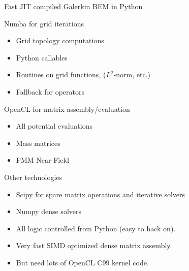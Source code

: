 \documentclass[dvipsnames,10pt]{beamer}
\begin{document}
\begin{frame}{Fast JIT compiled Galerkin BEM in Python}

\begin{minipage}{5cm}
\begin{small}
{\color{blue} Numba for grid iterations}
\begin{itemize}
    \item Grid topology computations
    \item Python callables
    \item Routines on grid functions, ($L^2$-norm, etc.)
    \item Fallback for operators
\end{itemize}
\end{small}
\end{minipage}
\begin{minipage}{5cm}
\vspace{-.6cm}
\begin{small}
{\color{blue} OpenCL for matrix assembly/evaluation}
\begin{itemize}
    \item All potential evaluations
    \item Mass matrices
    \item FMM Near-Field
\end{itemize}
\end{small}
\end{minipage}

\vspace{\baselineskip}

\begin{small}
{\color{blue} Other technologies }
\begin{itemize}
    \item Scipy for spare matrix operations and iterative solvers
    \item Numpy dense solvers
\end{itemize}
\end{small}

\vspace{\baselineskip}

\begin{tcolorbox}
\begin{itemize}
\item All logic controlled from Python (easy to hack on).
\item Very fast SIMD optimized dense matrix assembly.
\item But need lots of OpenCL C99 kernel code.
\end{itemize}
\end{tcolorbox}

\end{frame}
\end{document}
